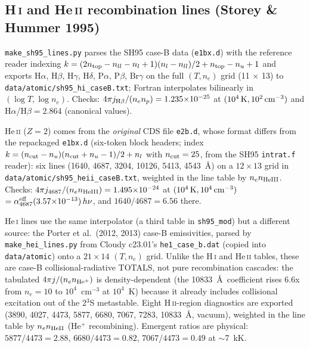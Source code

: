 \documentclass[english,a4paper]{my_memo}
\newcommand{\code}[1]{\texttt{#1}}
\begin{document}
\subsection{H\,\textsc{i} and He\,\textsc{ii} recombination lines
(Storey \& Hummer 1995)}
\code{make\_sh95\_lines.py} parses the SH95 case-B data (\code{e1bx.d})
with the reference reader indexing
$k = (2n_{\rm top} - n_{ll} - n_l + 1)(n_l - n_{ll})/2 + n_{\rm top} -
n_u + 1$ and exports H$\alpha$, H$\beta$, H$\gamma$, H$\delta$,
P$\alpha$, P$\beta$, Br$\gamma$ on the full $(T, n_e)$ grid
(11 $\times$ 13) to \code{data/atomic/sh95\_hi\_caseB.txt}; Fortran
interpolates bilinearly in $(\log T, \log n_e)$.  Checks:
$4\pi j_{{\rm H}\beta}/(n_e n_p) = 1.235{\times}10^{-25}$ at
$(10^4\,{\rm K}, 10^2\,{\rm cm^{-3}})$ and
H$\alpha$/H$\beta = 2.864$ (canonical values).

He\,\textsc{ii} ($Z = 2$) comes from the \emph{original} CDS file
\code{e2b.d}, whose format differs from the repackaged \code{e1bx.d}
(six-token block headers; index
$k = (n_{\rm cut}-n_u)(n_{\rm cut}+n_u-1)/2 + n_l$ with
$n_{\rm cut} = 25$, from the SH95 \code{intrat.f} reader): six lines
(1640, 4687, 3204, 10126, 5413, 4543~\AA) on a $12 \times 13$ grid in
\code{data/atomic/sh95\_heii\_caseB.txt}, weighted in the line table by
$n_e n_{\rm HeIII}$.  Checks:
$4\pi j_{4687}/(n_e n_{\rm HeIII}) = 1.495{\times}10^{-24}$ at
$(10^4\,{\rm K}, 10^4\,{\rm cm^{-3}})$
$= \alpha^{\rm eff}_{4687}(3.57{\times}10^{-13})\,h\nu$, and
$1640/4687 = 6.56$ there.

He\,\textsc{i} lines use the same interpolator (a third
table in \code{sh95\_mod}) but a different source: the Porter et al.\
(2012, 2013) case-B emissivities, parsed by \code{make\_hei\_lines.py}
from Cloudy c23.01's \code{he1\_case\_b.dat} (copied into
\code{data/atomic}) onto a $21 \times 14$ $(T, n_e)$ grid.  Unlike the
H\,\textsc{i} and He\,\textsc{ii} tables, these are case-B
collisional-radiative TOTALS, not pure recombination cascades: the
tabulated $4\pi j/(n_e n_{\rm He^+})$ is density-dependent (the 10833~\AA\
coefficient rises 6.6x from $n_e = 10$ to $10^4$~cm$^{-3}$ at $10^4$~K)
because it already includes collisional excitation out of the 2$^3$S
metastable.  Eight H\,\textsc{ii}-region diagnostics are exported
(3890, 4027, 4473, 5877, 6680, 7067, 7283, 10833~\AA, vacuum), weighted in
the line table by $n_e n_{\rm HeII}$ (He$^+$ recombining).  Emergent
ratios are physical: $5877/4473 = 2.88$, $6680/4473 = 0.82$,
$7067/4473 = 0.49$ at $\sim$7~kK.
\end{document}
